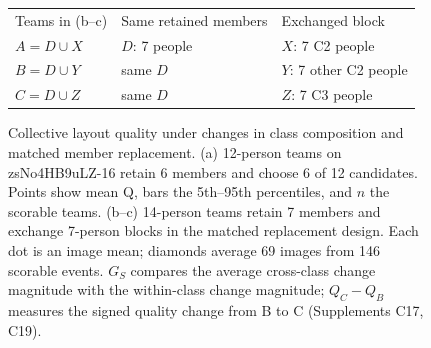 \begin{figure}[t]
\centering
\setcounter{subfigure}{0}
%
\hfill%
%
\hfill%
\par\smallskip
{\footnotesize
\begin{tabular}{@{}lll@{}}
Teams in (b--c) & Same retained members & Exchanged block\\
$A=D\cup X$ & $D$: 7 people & $X$: 7 C2 people\\
$B=D\cup Y$ & same $D$ & $Y$: 7 other C2 people\\
$C=D\cup Z$ & same $D$ & $Z$: 7 C3 people
\end{tabular}}
\caption{Collective layout quality under changes in class composition and matched member replacement. (a) 12-person teams on zsNo4HB9uLZ-16 retain 6 members and choose 6 of 12 candidates. Points show mean Q, bars the 5th--95th percentiles, and $n$ the scorable teams. (b--c) 14-person teams retain 7 members and exchange 7-person blocks in the matched replacement design. Each dot is an image mean; diamonds average 69 images from 146 scorable events. $G_S$ compares the average cross-class change magnitude with the within-class change magnitude; $Q_C-Q_B$ measures the signed quality change from B to C (Supplements C17, C19).}
\label{fig:composition-members}\label{fig:matched-half}\label{fig:team-comparison-design}
\end{figure}
